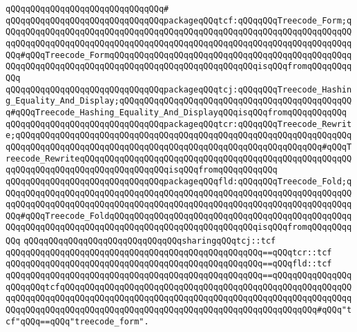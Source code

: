 \verb|qQQqqQQqqQQqqQQqqQQqqQQqqQQqqQQq#|\newline
\verb|qQQqqQQqqQQqqQQqqQQqqQQqqQQqqQQqpackageqQQqtcf:qQQqqQQqTreecode_Form;qQQqqQQqqQQqqQQqqQQqqQQqqQQqqQQqqQQqqQQqqQQqqQQqqQQqqQQqqQQqqQQqqQQqqQQqqQQqqQQqqQQqqQQqqQQqqQQqqQQqqQQqqQQqqQQqqQQqqQQqqQQqqQQqqQQqqQQqqQQqqQQq#qQQqTreecode_FormqQQqqQQqqQQqqQQqqQQqqQQqqQQqqQQqqQQqqQQqqQQqqQQqqQQqqQQqqQQqqQQqqQQqqQQqqQQqqQQqqQQqqQQqqQQqqQQqqQQqisqQQqfromqQQqqQQqqQQq|\newline
\verb|qQQqqQQqqQQqqQQqqQQqqQQqqQQqqQQqpackageqQQqtcj:qQQqqQQqTreecode_Hashing_Equality_And_Display;qQQqqQQqqQQqqQQqqQQqqQQqqQQqqQQqqQQqqQQqqQQqqQQq#qQQqTreecode_Hashing_Equality_And_DisplayqQQqisqQQqfromqQQqqQQqqQQq|\newline
\verb|qQQqqQQqqQQqqQQqqQQqqQQqqQQqqQQqpackageqQQqtcr:qQQqqQQqTreecode_Rewrite;qQQqqQQqqQQqqQQqqQQqqQQqqQQqqQQqqQQqqQQqqQQqqQQqqQQqqQQqqQQqqQQqqQQqqQQqqQQqqQQqqQQqqQQqqQQqqQQqqQQqqQQqqQQqqQQqqQQqqQQqqQQqqQQqqQQq#qQQqTreecode_RewriteqQQqqQQqqQQqqQQqqQQqqQQqqQQqqQQqqQQqqQQqqQQqqQQqqQQqqQQqqQQqqQQqqQQqqQQqqQQqqQQqqQQqqQQqisqQQqfromqQQqqQQqqQQq|\newline
\verb|qQQqqQQqqQQqqQQqqQQqqQQqqQQqqQQqpackageqQQqfld:qQQqqQQqTreecode_Fold;qQQqqQQqqQQqqQQqqQQqqQQqqQQqqQQqqQQqqQQqqQQqqQQqqQQqqQQqqQQqqQQqqQQqqQQqqQQqqQQqqQQqqQQqqQQqqQQqqQQqqQQqqQQqqQQqqQQqqQQqqQQqqQQqqQQqqQQqqQQqqQQq#qQQqTreecode_FoldqQQqqQQqqQQqqQQqqQQqqQQqqQQqqQQqqQQqqQQqqQQqqQQqqQQqqQQqqQQqqQQqqQQqqQQqqQQqqQQqqQQqqQQqqQQqqQQqqQQqisqQQqfromqQQqqQQqqQQq|\newline
\newline
\verb|qQQqqQQqqQQqqQQqqQQqqQQqqQQqqQQqsharingqQQqtcj::tcf|\newline
\verb|qQQqqQQqqQQqqQQqqQQqqQQqqQQqqQQqqQQqqQQqqQQqqQQqqQQq==qQQqtcr::tcf|\newline
\verb|qQQqqQQqqQQqqQQqqQQqqQQqqQQqqQQqqQQqqQQqqQQqqQQqqQQq==qQQqfld::tcf|\newline
\verb|qQQqqQQqqQQqqQQqqQQqqQQqqQQqqQQqqQQqqQQqqQQqqQQqqQQq==qQQqqQQqqQQqqQQqqQQqqQQqtcfqQQqqQQqqQQqqQQqqQQqqQQqqQQqqQQqqQQqqQQqqQQqqQQqqQQqqQQqqQQqqQQqqQQqqQQqqQQqqQQqqQQqqQQqqQQqqQQqqQQqqQQqqQQqqQQqqQQqqQQqqQQqqQQqqQQqqQQqqQQqqQQqqQQqqQQqqQQqqQQqqQQqqQQqqQQqqQQqqQQqqQQqqQQqqQQq#qQQq"tcf"qQQq==qQQq"treecode_form".|\newline

